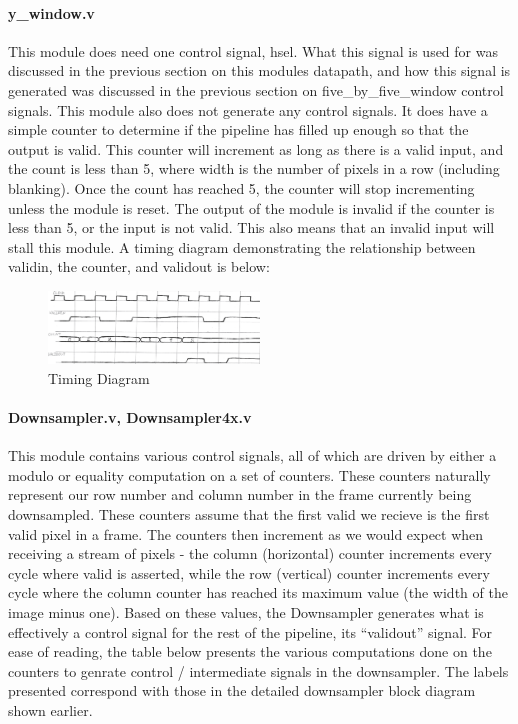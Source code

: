 \paragraph{y\_window.v}
This module does need one control signal, hsel. What this signal is used for was 
discussed in the previous section on this modules datapath, and how this 
signal is generated was discussed in the previous section on five\_by\_five\_window 
control signals. This module also does not generate any control signals. It does 
have a simple counter to determine if the pipeline has filled up enough so that 
the output is valid. This counter will increment as long as there is a valid 
input, and the count is less than 5, where width is the number of pixels in 
a row (including blanking). Once the count has reached 5, the counter will stop 
incrementing unless the module is reset. The output of the module is invalid if 
the counter is less than 5, or the input is not valid. This also means that an 
invalid input will stall this module. A timing diagram demonstrating the 
relationship between validin, the counter, and validout is below: 


\begin{figure}
    \includegraphics[width=0.5\textwidth]{processed_image_pngs/timing_2.png}
    \caption{Timing Diagram}
    \label{fig:timing_2}
\end{figure}



\paragraph{Downsampler.v, Downsampler4x.v}
This module contains various control signals, all of which are driven by either
a modulo or equality computation on a set of counters. These counters naturally
represent our row number and column number in the frame currently being downsampled.
These counters assume that the first valid we recieve is the first valid pixel in a 
frame. The counters then increment as we would expect when receiving a stream of pixels - 
the column (horizontal) counter increments every cycle where valid is asserted, 
while the row (vertical) counter increments every cycle where the column counter
has reached its maximum value (the width of the image minus one). Based on these
values, the Downsampler generates what is effectively a control signal for the
rest of the pipeline, its ``validout'' signal. For ease of reading, the table
below presents the various computations done on the counters to genrate control / 
intermediate signals in the downsampler. The labels presented correspond with
those in the detailed downsampler block diagram shown earlier.

